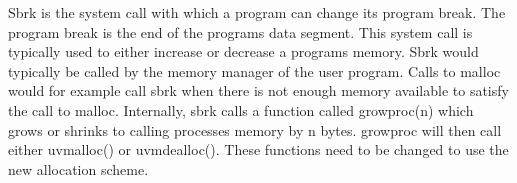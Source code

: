 Sbrk is the system call with which a program can change its program break. The program break
is the end of the programs data segment. This system call is typically used to either
increase or decrease a programs memory.
Sbrk would typically be called by the memory manager of the user program. Calls
to malloc would for example call sbrk when there is not enough memory available to
satisfy the call to malloc.
Internally, sbrk calls a function called growproc(n) which grows or shrinks to calling
processes memory by n bytes.
growproc will then call either uvmalloc() or uvmdealloc(). These functions need to be
changed to use the new allocation scheme.

